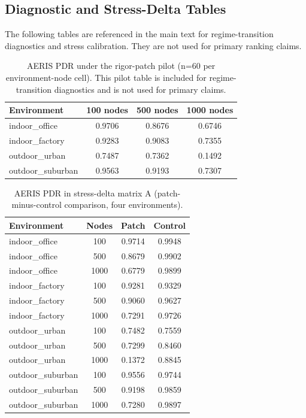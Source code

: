 ﻿\documentclass[sensors,article,submit,moreauthors,pdftex]{Definitions/mdpi}
\begin{document}
\begin{appendix}
\section{Diagnostic and Stress-Delta Tables}

The following tables are referenced in the main text for regime-transition diagnostics and stress calibration. They are not used for primary ranking claims.

\begin{table}[H]
\caption{AERIS PDR under the rigor-patch pilot (n=60 per environment-node cell). This pilot table is included for regime-transition diagnostics and is not used for primary claims.}
\label{tab:rigor_patch}
\centering
\begin{tabular}{lccc}
\toprule
Environment & 100 nodes & 500 nodes & 1000 nodes \\
\midrule
indoor\_office    & 0.9706 & 0.8676 & 0.6746 \\
indoor\_factory   & 0.9283 & 0.9083 & 0.7355 \\
outdoor\_urban    & 0.7487 & 0.7362 & 0.1492 \\
outdoor\_suburban & 0.9563 & 0.9193 & 0.7307 \\
\bottomrule
\end{tabular}
\end{table}

\begin{table}[H]
\caption{AERIS PDR in stress-delta matrix A (patch-minus-control comparison, four environments).}
\label{tab:s9_patch_control}
\centering
\begin{tabular}{lccc}
\toprule
Environment & Nodes & Patch & Control \\
\midrule
indoor\_office & 100  & 0.9714 & 0.9948 \\
indoor\_office & 500  & 0.8679 & 0.9902 \\
indoor\_office & 1000 & 0.6779 & 0.9899 \\
indoor\_factory & 100  & 0.9281 & 0.9329 \\
indoor\_factory & 500  & 0.9060 & 0.9627 \\
indoor\_factory & 1000 & 0.7291 & 0.9726 \\
outdoor\_urban & 100  & 0.7482 & 0.7559 \\
outdoor\_urban & 500  & 0.7299 & 0.8460 \\
outdoor\_urban & 1000 & 0.1372 & 0.8845 \\
outdoor\_suburban & 100  & 0.9556 & 0.9744 \\
outdoor\_suburban & 500  & 0.9198 & 0.9859 \\
outdoor\_suburban & 1000 & 0.7280 & 0.9897 \\
\bottomrule
\end{tabular}
\end{table}


\end{appendix}
\end{document}
